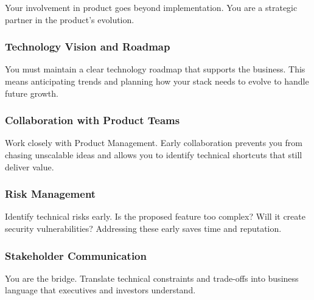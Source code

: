 Your involvement in product goes beyond implementation. You are a strategic partner in the product's evolution.

\subsubsection{Technology Vision and Roadmap}
You must maintain a clear technology roadmap that supports the business. This means anticipating trends and planning how your stack needs to evolve to handle future growth.

\subsubsection{Collaboration with Product Teams}
Work closely with Product Management. Early collaboration prevents you from chasing unscalable ideas and allows you to identify technical shortcuts that still deliver value.

\subsubsection{Risk Management}
Identify technical risks early. Is the proposed feature too complex? Will it create security vulnerabilities? Addressing these early saves time and reputation.

\subsubsection{Stakeholder Communication}
You are the bridge. Translate technical constraints and trade-offs into business language that executives and investors understand.
